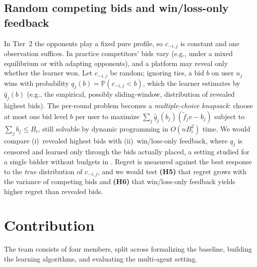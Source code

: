 \documentclass{article}
\theoremstyle{definition}
\theoremstyle{remark}
\renewcommand{\Pr}{\mathbb{P}}
\begin{document}
\subsection{Random competing bids and win/loss-only feedback}
\label{sec:future-mixed}

In Tier~2 the opponents play a fixed pure profile, so $c_{-i,j}$ is constant and one
observation suffices. In practice competitors' bids vary (e.g., under a mixed
equilibrium or with adapting opponents), and a platform may reveal only whether the
learner won. Let $c_{-i,j}$ be random; ignoring ties, a bid $b$ on user $u_j$ wins with
probability $q_j(b)=\Pr(c_{-i,j}<b)$, which the learner estimates by $\hat q_j(b)$
(e.g., the empirical, possibly sliding-window, distribution of revealed highest bids).
The per-round problem becomes a \emph{multiple-choice knapsack}: choose at most one
bid level $b$ per user to maximize $\sum_j\hat q_j(b_j)(\tilde f_j v-b_j)$ subject to
$\sum_j b_j\le B_i$, still solvable by dynamic programming in $O(nB_i^2)$ time. We
would compare (i)~revealed highest bids with (ii)~win/loss-only feedback, where $q_j$ is
censored and learned only through the bids actually placed, a setting studied for a
single bidder without budgets in \citep{han2020optimal}. Regret is measured against
the best response to the \emph{true} distribution of $c_{-i,j}$, and we would test
\textbf{(H5)} that regret grows with the variance of competing bids and
\textbf{(H6)} that win/loss-only feedback yields higher regret than revealed bids.

\section{Contribution}
\label{sec:contrib}

The team consists of four members, split across formalizing the baseline, building the learning algorithms, and evaluating the multi-agent setting.
\end{document}
